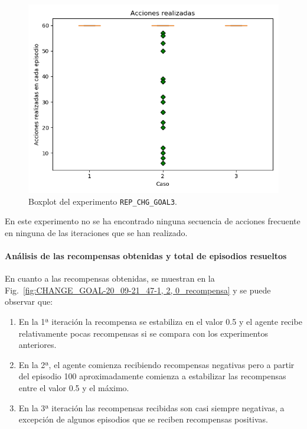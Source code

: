 \begin{figure}
    \centering
    \includegraphics[scale=0.4]{cap5_experimentacion/images/CHANGE_GOAL-20_09-21_47-1, 2, 0_boxplot.png}
    \caption{Boxplot del experimento \texttt{REP\_CHG\_GOAL3}.}
    \label{fig:CHANGE_GOAL-20_09-21_47-1, 2, 0_boxplot}
\end{figure}

En este experimento no se ha encontrado ninguna secuencia de acciones frecuente en ninguna de las iteraciones que se han realizado. 

\paragraph{Análisis de las recompensas obtenidas y total de episodios resueltos} 

En cuanto a las recompensas obtenidas, se muestran en la Fig.~\ref{fig:CHANGE_GOAL-20_09-21_47-1, 2, 0_recompensa} y se puede observar que: 
\begin{enumerate}
    \item En la 1ª iteración la recompensa se estabiliza en el valor 0.5 y el agente recibe relativamente pocas recompensas si se compara con los experimentos anteriores.
    \item En la 2ª, el agente comienza recibiendo recompensas negativas pero a partir del episodio 100 aproximadamente comienza a estabilizar las recompensas entre el valor 0.5 y el máximo. 
    \item En la 3ª iteración las recompensas recibidas son casi siempre negativas, a excepción de algunos episodios que se reciben recompensas positivas. 
\end{enumerate}

